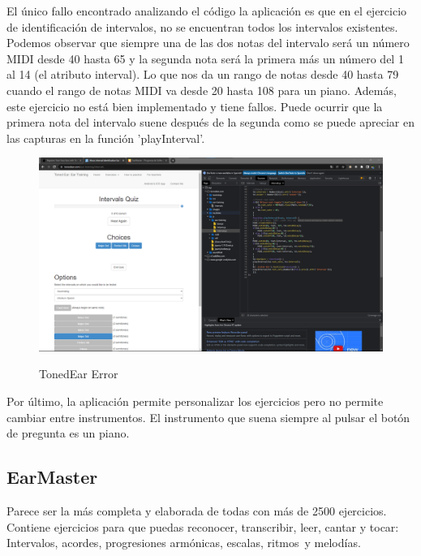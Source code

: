 \documentclass[12pt,twoside,titlepage]{report}
\begin{document}
El único fallo encontrado analizando el código la aplicación es que en el ejercicio de identificación de intervalos, no se encuentran todos los intervalos existentes. Podemos observar que siempre una de las dos notas del intervalo será un número MIDI desde 40 hasta 65 y la segunda nota será la primera más un número del 1 al 14 (el atributo interval). Lo que nos da un rango de notas desde 40 hasta 79 cuando el rango de notas MIDI va desde 20 hasta 108 para un piano. Además, este ejercicio no está bien implementado y tiene fallos. Puede ocurrir que la primera nota del intervalo suene después de la segunda como se puede apreciar en las capturas en la función 'playInterval'.

\begin{figure}[H] 
    \includegraphics[scale=0.25]{Estado del Arte/tonedearerror}
    \centering
    \label{fig:tonedearerror}
    \caption{TonedEar Error}
\end{figure}

Por último, la aplicación permite personalizar los ejercicios pero no permite cambiar entre instrumentos. El instrumento que suena siempre al pulsar el botón de pregunta es un piano.

\subsection{EarMaster}

Parece ser la más completa y elaborada de todas con más de 2500 ejercicios. Contiene ejercicios para que puedas reconocer, transcribir, leer, cantar y tocar: Intervalos, acordes, progresiones armónicas, escalas, ritmos y melodías.
\end{document}
